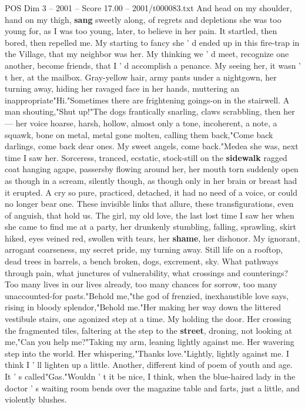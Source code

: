 \begin{textsample}{POS Dim 3 – 2001 – Score 17.00 – 2001/t000083.txt}
And head on my shoulder, hand on my thigh, \textbf{sang} sweetly along, of regrets and depletions she was too young for, as I was too young, later, to believe in her pain.
It startled, then bored, then repelled me.
My starting to fancy she ' d ended up in this fire-trap in the Village, that my neighbor was her.
My thinking we ' d meet, recognize one another, become friends, that I ' d accomplish a penance.
My seeing her, it wasn ' t her, at the mailbox.
Gray-yellow hair, army pants under a nightgown, her turning away, hiding her ravaged face in her hands, muttering an inappropriate"Hi."Sometimes there are frightening goings-on in the stairwell.
A man shouting,"Shut up!"The dogs frantically snarling, claws scrabbling, then her — her voice hoarse, harsh, hollow, almost only a tone, incoherent, a note, a squawk, bone on metal, metal gone molten, calling them back,"Come back darlings, come back dear ones.
My sweet angels, come back."Medea she was, next time I saw her.
Sorceress, tranced, ecstatic, stock-still on the \textbf{sidewalk} ragged coat hanging agape, passersby flowing around her, her mouth torn suddenly open as though in a scream, silently though, as though only in her brain or breast had it erupted.
A cry so pure, practiced, detached, it had no need of a voice, or could no longer bear one.
These invisible links that allure, these transfigurations, even of anguish, that hold us.
The girl, my old love, the last lost time I saw her when she came to find me at a party, her drunkenly stumbling, falling, sprawling, skirt hiked, eyes veined red, swollen with tears, her \textbf{shame}, her dishonor.
My ignorant, arrogant coarseness, my secret pride, my turning away.
Still life on a rooftop, dead trees in barrels, a bench broken, dogs, excrement, sky.
What pathways through pain, what junctures of vulnerability, what crossings and counterings?
Too many lives in our lives already, too many chances for sorrow, too many unaccounted-for pasts."Behold me,"the god of frenzied, inexhaustible love says, rising in bloody splendor,"Behold me."Her making her way down the littered vestibule stairs, one agonized step at a time.
My holding the door.
Her crossing the fragmented tiles, faltering at the step to the \textbf{street}, droning, not looking at me,"Can you help me?"Taking my arm, leaning lightly against me.
Her wavering step into the world.
Her whispering,"Thanks love."Lightly, lightly against me.
I think I ' ll lighten up a little.
Another, different kind of poem of youth and age.
It ' s called"Gas."Wouldn ' t it be nice, I think, when the blue-haired lady in the doctor ' s waiting room bends over the magazine table and farts, just a little, and violently blushes.

\end{textsample}
